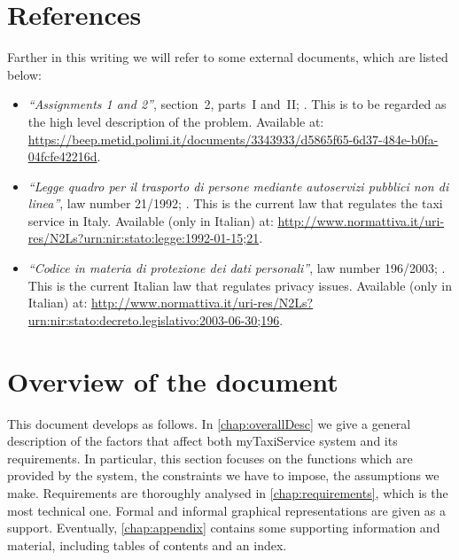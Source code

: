 \section{References}\label{sec:references}	
Farther in this writing we will refer to some external documents, which are listed below:
\begin{itemize}
	\item \emph{``Assignments 1 and 2''}, section~2, parts~I and~II; . This is to be regarded as the high level description of the problem. Available at: \url{https://beep.metid.polimi.it/documents/3343933/d5865f65-6d37-484e-b0fa-04fcfe42216d}.
	\item \emph{``Legge quadro per il trasporto di persone mediante autoservizi pubblici non di linea''}, law number 21/1992; . This is the current law that regulates the taxi service in Italy. Available (only in Italian) at: \url{http://www.normattiva.it/uri-res/N2Ls?urn:nir:stato:legge:1992-01-15;21}.
	\item \emph{``Codice in materia di protezione dei dati personali''}, law number 196/2003; . This is the current Italian law that regulates privacy issues. Available (only in Italian) at: \url{http://www.normattiva.it/uri-res/N2Ls?urn:nir:stato:decreto.legislativo:2003-06-30;196}.
\end{itemize}


\section{Overview of the document}	
This document develops as follows. In \cref{chap:overallDesc} we give a general description of the factors that affect both myTaxiService system and its requirements. In particular, this section focuses on the functions which are provided by the system, the constraints we have to impose, the assumptions we make. Requirements are thoroughly analysed in \cref{chap:requirements}, which is the most technical one. Formal and informal graphical representations are given as a support. Eventually, \cref{chap:appendix} contains some supporting information and material, including tables of contents and an index.


